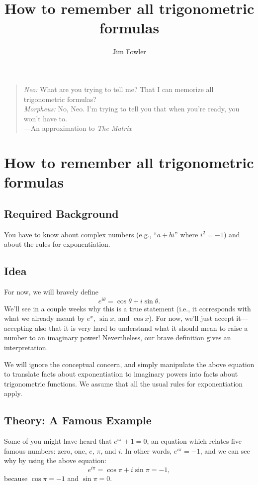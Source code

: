 \documentclass[12pt]{article}
\title{How to remember all trigonometric formulas}
\author{Jim Fowler}
\begin{document}
\null\hfill\parbox{5.5in}{
\begin{verse}
\textit{Neo:} What are you trying to tell me? That I can memorize all trigonometric formulas? \\
\textit{Morpheus:} No, Neo. I'm trying to tell you that when you're ready, you won't have to. \\
\null\hfill ---An approximation to \textit{The Matrix}
\end{verse}}

\section*{How to remember all trigonometric formulas}

\subsection*{Required Background}

You have to know about complex numbers (e.g., ``$a+bi$'' where $i^2 =
-1$) and about the rules for exponentiation.

\subsection*{Idea}

For now, we will bravely define
$$
e^{i\theta} = \cos \theta + i \sin \theta.
$$
We'll see in a couple weeks why this is a true statement (i.e., it
corresponds with what we already meant by $e^x$, $\sin x$, and $\cos
x$).  For now, we'll just accept it---accepting also that it is very
hard to understand what it should mean to raise a number to an
imaginary power!  Nevertheless, our brave definition gives an
interpretation.

We will ignore the conceptual concern, and simply manipulate the above
equation to translate facts about exponentiation to imaginary powers
into facts about trigonometric functions.  We assume that all the
usual rules for exponentiation apply.

\subsection*{Theory: A Famous Example}

Some of you might have heard that $e^{i\pi} + 1 = 0$, an equation
which relates five famous numbers: zero, one, $e$, $\pi$, and $i$.  In
other words, $e^{i\pi} = -1$, and we can see why by using the above
equation:
$$
e^{i \pi} = \cos \pi + i \sin \pi = -1,
$$
because $\cos \pi = -1$ and $\sin \pi = 0$.
\end{document}
